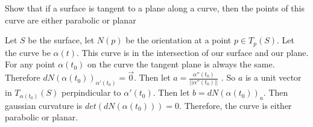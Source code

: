 \documentclass[12pt,letterpaper]{hmcpset}
\begin{document}
\begin{problem}
\end{problem}
\begin{solution}
\end{solution}

\medskip

\newpage
\begin{problem}
\end{problem}
\begin{solution}
\end{solution}

\newpage
\begin{problem}
\\ \\
Show that if a surface is tangent to a plane along a curve, then the points of this curve are either parabolic or planar
\end{problem}
\begin{solution}
  Let $S$ be the surface, let $N(p)$ be the orientation at a point $p \in T_p(S)$.
Let the curve be $\alpha(t)$. This curve is in the intersection of our surface and
  our plane. For any point $\alpha(t_0)$ on the curve the tangent plane
  is always the same.  Therefore $dN(\alpha(t_0))_{\alpha'(t_0)} = \vec{0}$. Then let
  $a=\frac{\alpha''(t_0)}{||\alpha''(t_0)||}$ . So $a$ is a unit vector in $T_{\alpha(t_0)}(S)$
  perpindicular to $\alpha'(t_0)$. Then let $b = dN(\alpha(t_0))_{a}$. Then gaussian
  curvature is $det(dN(\alpha(t_0))) = 0$. Therefore, the curve is either parabolic
  or planar. 
\end{solution}
\end{document}
